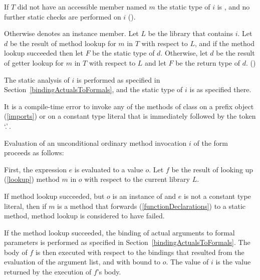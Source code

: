 \documentclass[makeidx]{article}
\begin{document}
\LMHash{}%
If $T$ did not have an accessible member named $m$ the static type of $i$ is \DYNAMIC{},
and no further static checks are performed on $i$
().

\LMHash{}%
Otherwise  denotes an instance member.
Let $L$ be the library that contains $i$.
Let $d$ be the result of method lookup for $m$ in $T$ with respect to $L$,
and if the method lookup succeeded then let $F$ be the static type of $d$.
Otherwise, let $d$ be the result of getter lookup for $m$ in $T$ with respect to $L$
and let $F$ be the return type of $d$.
()

\LMHash{}%
The static analysis of $i$ is performed as specified in Section~\ref{bindingActualsToFormals},
and the static type of $i$ is as specified there.

\LMHash{}%
It is a compile-time error to invoke any of the methods of class  on a prefix object (\ref{imports})
or on a constant type literal that is immediately followed by the token `.'\,.


\LMHash{}%
Evaluation of an unconditional ordinary method invocation $i$ of the form
proceeds as follows:

\LMHash{}%
First, the expression $e$ is evaluated to a value $o$.
Let $f$ be the result of looking up (\ref{lookup}) method $m$ in $o$ with respect to the current library $L$.

\LMHash{}%
If method lookup succeeded,
but $o$ is an instance of  and $e$ is not a constant type literal,
then if $m$ is a method that forwards (\ref{functionDeclarations}) to a static method,
method lookup is considered to have failed.

\LMHash{}%
If the method lookup succeeded,
the binding of actual arguments to formal parameters is performed as specified in Section~\ref{bindingActualsToFormals}.
The body of $f$ is then executed with respect to the bindings that resulted from the evaluation of the argument list,
and with \THIS{} bound to $o$.
The value of $i$ is the value returned by the execution of $f$'s body.
\end{document}

